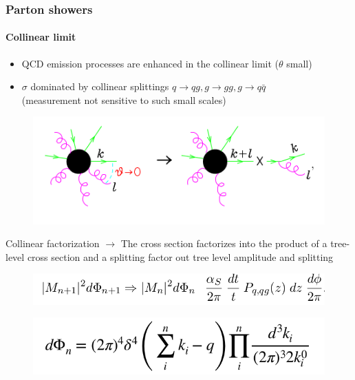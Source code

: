 \documentclass[aspectratio=43]{beamer}
\begin{document}
\begin{frame}

	\frametitle{Parton showers}
	\framesubtitle{Collinear limit}
	
	\begin{itemize} 
		\item \footnotesize QCD emission processes are enhanced in the collinear limit ($\theta$ small)
		\item \footnotesize $\sigma$ dominated by collinear splittings $q \rightarrow qg, g \rightarrow gg, g \rightarrow q\bar{q}$ \\
		(measurement not sensitive to such small scales)
	\end{itemize}
	
	\begin{figure}
		\includegraphics[width = 6 cm]{plots/collinear_factorization.png}
	\end{figure}
	
	\footnotesize Collinear factorization $\longrightarrow$ The cross section factorizes
	into the product of a tree-level cross section and a splitting
	factor out tree level amplitude and splitting
	\begin{figure}
		\includegraphics[width = 7 cm]{plots/eq_factorization_theorem.png}
	\end{figure}

	\begin{figure}
		\includegraphics[width = 5 cm]{plots/eq_factorization_ps.png}
	\end{figure}

\end{frame}
\end{document}
